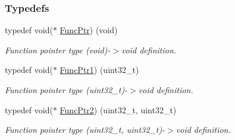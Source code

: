 \subsubsection*{Typedefs}
\begin{DoxyCompactItemize}
\item 
\mbox{\label{a00020_a3d987633d7a3ca10c14905a807b62eb1}} 
typedef void($\ast$ \mbox{\hyperlink{a00020_a3d987633d7a3ca10c14905a807b62eb1}{Func\+Ptr}}) (void)
\begin{DoxyCompactList}\small\item\em Function pointer type (void)-\/$>$void definition. \end{DoxyCompactList}\item 
\mbox{\label{a00020_a0891965816a5b721b07f7bebefaf7430}} 
typedef void($\ast$ \mbox{\hyperlink{a00020_a0891965816a5b721b07f7bebefaf7430}{Func\+Ptr1}}) (uint32\+\_\+t)
\begin{DoxyCompactList}\small\item\em Function pointer type (uint32\+\_\+t)-\/$>$void definition. \end{DoxyCompactList}\item 
\mbox{\label{a00020_a331a88eeefe11112bb8fe1b43dd777b8}} 
typedef void($\ast$ \mbox{\hyperlink{a00020_a331a88eeefe11112bb8fe1b43dd777b8}{Func\+Ptr2}}) (uint32\+\_\+t, uint32\+\_\+t)
\begin{DoxyCompactList}\small\item\em Function pointer type (uint32\+\_\+t, uint32\+\_\+t)-\/$>$void definition. \end{DoxyCompactList}\end{DoxyCompactItemize}
